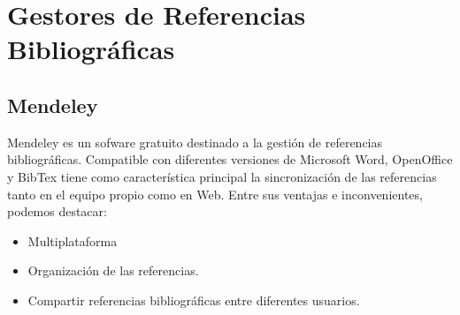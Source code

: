 \section{Gestores de Referencias Bibliográficas}

\subsection{Mendeley}
Mendeley es un sofware  gratuito destinado a la gestión de referencias bibliográficas. Compatible con diferentes versiones de Microsoft Word, OpenOffice y BibTex tiene como característica principal la sincronización de las referencias tanto en el equipo  propio como en Web. \nocite{ucm:mendeley}
Entre sus ventajas e inconvenientes, podemos destacar: 
\begin{itemize}
\item Multiplataforma
\item Organización de las referencias. 
\item Compartir referencias bibliográficas entre diferentes usuarios. 

\end{itemize}
